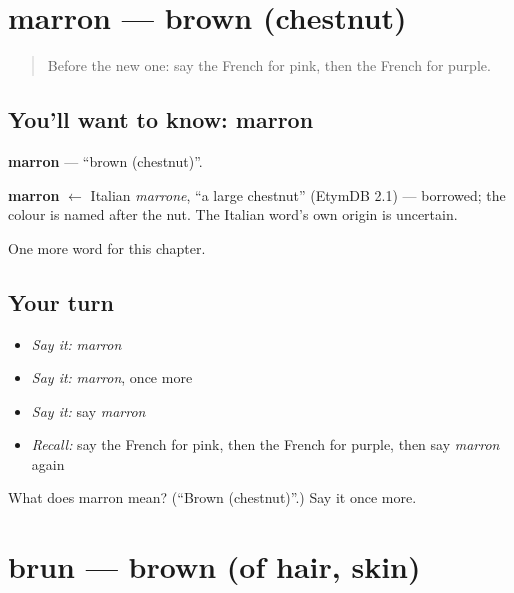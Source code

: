 \section[marron]{marron — brown (chestnut)}

\label{lesson:FR-C130-marron}



\begin{quote}
Before the new one: say the French for pink, then the French for purple.
\end{quote}

\subsection*{You'll want to know: marron}
\textbf{marron} — \textquotedblleft{}brown (chestnut)\textquotedblright{}.

\begin{cousinweb}
\textbf{marron} $\leftarrow$ Italian \emph{marrone}, \textquotedblleft{}a large chestnut\textquotedblright{} (EtymDB 2.1) — borrowed; the colour is named after the nut. The Italian word's own origin is uncertain.
\end{cousinweb}

\begin{grammarlens}[title={What you've built}]
One more word for this chapter.
\end{grammarlens}

\subsection*{Your turn}
\begin{itemize}
\raggedright
  \item \emph{Say it:} \emph{marron}
  \item \emph{Say it:} \emph{marron}, once more
  \item \emph{Say it:} say \emph{marron}
  \item \emph{Recall:} say the French for pink, then the French for purple, then say \emph{marron} again
\end{itemize}

\begin{tcolorbox}[breakable,colback=teal!4,colframe=teal!35!black,title={Before you move on}]
What does marron mean? (\textquotedblleft{}Brown (chestnut)\textquotedblright{}.) Say it once more.
\end{tcolorbox}
\section[brun]{brun — brown (of hair, skin)}

